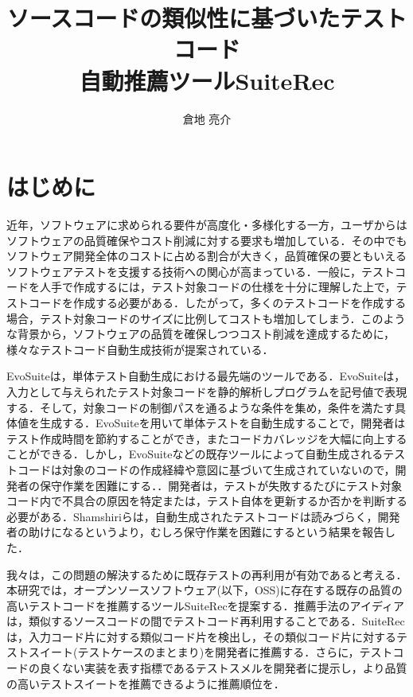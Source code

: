 \documentclass[12pt]{jarticle} %
\title{ソースコードの類似性に基づいたテストコード\\自動推薦ツールSuiteRec}
\author{倉地 亮介}
\begin{document}
%
%
\titlepage
\cmemberspage
\firstabstract
\secondabstract
%
%
\toc
\newpage
\listoffigures
\listoftables
%
%
\newpage
\section{はじめに}
近年，ソフトウェアに求められる要件が高度化・多様化する一方，ユーザからはソフトウェアの品質確保やコスト削減に対する要求も増加している\cite{tanno}．その中でもソフトウェア開発全体のコストに占める割合が大きく，品質確保の要ともいえるソフトウェアテストを支援する技術への関心が高まっている\cite{b20}．一般に，テストコードを人手で作成するには，テスト対象コードの仕様を十分に理解した上で，テストコードを作成する必要がある．したがって，多くのテストコードを作成する場合，テスト対象コードのサイズに比例してコストも増加してしまう．このような背景から，ソフトウェアの品質を確保しつつコスト削減を達成するために，様々なテストコード自動生成技術が提案されている\cite{b19,EvoSuite,GRT,b17,T3}．

{\sf EvoSuite}\cite{EvoSuite}は，単体テスト自動生成における最先端のツールである．{\sf EvoSuite}は，入力として与えられたテスト対象コードを静的解析しプログラムを記号値で表現する．そして，対象コードの制御パスを通るような条件を集め，条件を満たす具体値を生成する．{\sf EvoSuite}を用いて単体テストを自動生成することで，開発者はテスト作成時間を節約することができ，またコードカバレッジを大幅に向上することができる．しかし，{\sf EvoSuite}などの既存ツールによって自動生成されるテストコードは対象のコードの作成経緯や意図に基づいて生成されていないので，開発者の保守作業を困難にする．\cite{b14,b15,b13}．開発者は，テストが失敗するたびにテスト対象コード内で不具合の原因を特定または，テスト自体を更新するか否かを判断する必要がある．Shamshiriら\cite{b1}は，自動生成されたテストコードは読みづらく，開発者の助けになるというより，むしろ保守作業を困難にするという結果を報告した．

我々は，この問題の解決するために既存テストの再利用が有効であると考える．本研究では，オープンソースソフトウェア(以下，OSS)に存在する既存の品質の高いテストコードを推薦するツール{\sf SuiteRec}を提案する．推薦手法のアイディアは，類似するソースコードの間でテストコード再利用することである．{\sf SuiteRec}は，入力コード片に対する類似コード片を検出し，その類似コード片に対するテストスイート(テストケースのまとまり)を開発者に推薦する．さらに，テストコードの良くない実装を表す指標であるテストスメルを開発者に提示し，より品質の高いテストスイートを推薦できるように推薦順位を．
\end{document}
